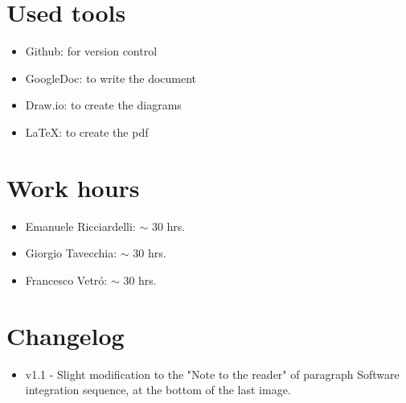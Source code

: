 \documentclass[10pt, a4paper,titlepage]{article}
\begin{document}
\section*{Used tools}
\begin{itemize}
\item Github: for version control
\item GoogleDoc: to write the document
\item Draw.io: to create the diagrams
\item \LaTeX: to create the pdf
\end{itemize}
\section*{Work hours} 
\begin{itemize}
\item Emanuele Ricciardelli: $\sim$ 30 hrs.
\item Giorgio Tavecchia: $\sim$ 30 hrs.
\item Francesco Vetr\'o: $\sim$ 30 hrs.
\end{itemize}
\section*{Changelog}
\begin{itemize}
\item v1.1
\subitem - Slight modification to the "Note to the reader" of paragraph Software integration sequence, at the bottom of the last image.
\end{itemize}
\end{document}
